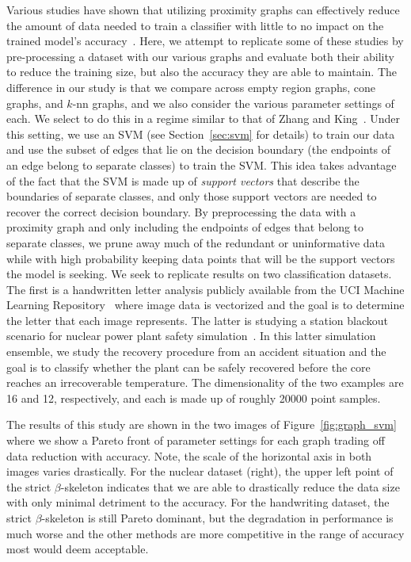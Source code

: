Various studies have shown that utilizing proximity graphs can effectively reduce the amount of data needed to train a classifier with little to no impact on the trained model's accuracy~\cite{BhattacharyaPoulsenToussaint1981,GotoIshidaUchida2015,Toussaint2005,ToussaintBerzan2012,ZhangKing2002a,ZhangKing2002b}.
%
Here, we attempt to replicate some of these studies by pre-processing a dataset with our various graphs and evaluate both their ability to reduce the training size, but also the accuracy they are able to maintain.
%
The difference in our study is that we compare across empty region graphs, cone graphs, and $k$-nn graphs, and we also consider the various parameter settings of each.
%
We select to do this in a regime similar to that of Zhang and King~\cite{ZhangKing2002a,ZhangKing2002b}.
%
Under this setting, we use an SVM (see Section~\ref{sec:svm} for details) to train our data and use the subset of edges that lie on the decision boundary (the endpoints of an edge belong to separate classes) to train the SVM.
%
This idea takes advantage of the fact that the SVM is made up of \textit{support vectors} that describe the boundaries of separate classes, and only those support vectors are needed to recover the correct decision boundary.
%
By preprocessing the data with a proximity graph and only including the endpoints of edges that belong to separate classes, we prune away much of the redundant or uninformative data while with high probability keeping data points that will be the support vectors the model is seeking.
%
We seek to replicate results on two classification datasets.
%
The first is a handwritten letter analysis publicly available from the UCI Machine Learning Repository~\cite{DuaGraff2017} where image data is vectorized and the goal is to determine the letter that each image represents.
%
The latter is studying a station blackout scenario for nuclear power plant safety simulation~\cite{MaljovecLiuWang2015}.
%
In this latter simulation ensemble, we study the recovery procedure from an accident situation and the goal is to classify whether the plant can be safely recovered before the core reaches an irrecoverable temperature.
%
The dimensionality of the two examples are 16 and 12, respectively, and each is made up of roughly 20000 point samples.

The results of this study are shown in the two images of Figure~\ref{fig:graph_svm} where we show a Pareto front of parameter settings for each graph trading off data reduction with accuracy.
%
Note, the scale of the horizontal axis in both images varies drastically.
%
For the nuclear dataset (right), the upper left point of the strict $\beta$-skeleton indicates that we are able to drastically reduce the data size with only minimal detriment to the accuracy.
%
For the handwriting dataset, the strict $\beta$-skeleton is still Pareto dominant, but the degradation in performance is much worse and the other methods are more competitive in the range of accuracy most would deem acceptable.

